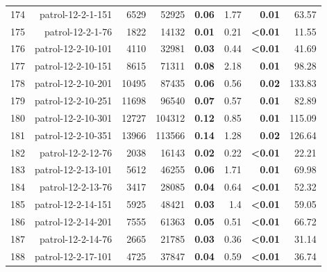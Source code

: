 \begin{longtable}{lrr@{\hskip 12pt}r@{\hskip 12pt}r@{\hskip 12pt}r@{\hskip 12pt}r@{\hskip 12pt}r}
174 & \multirow{1}{*}{patrol-12-2-1-151} & \multirow{1}{*}{6529} & \multirow{1}{*}{52925} & \textbf{0.06} & 1.77 & \textbf{0.01} & 63.57 \\
175 & \multirow{1}{*}{patrol-12-2-1-76} & \multirow{1}{*}{1822} & \multirow{1}{*}{14132} & \textbf{0.01} & 0.21 & \textbf{<0.01} & 11.55 \\
176 & \multirow{1}{*}{patrol-12-2-10-101} & \multirow{1}{*}{4110} & \multirow{1}{*}{32981} & \textbf{0.03} & 0.44 & \textbf{<0.01} & 41.69 \\
177 & \multirow{1}{*}{patrol-12-2-10-151} & \multirow{1}{*}{8615} & \multirow{1}{*}{71311} & \textbf{0.08} & 2.18 & \textbf{0.01} & 98.28 \\
178 & \multirow{1}{*}{patrol-12-2-10-201} & \multirow{1}{*}{10495} & \multirow{1}{*}{87435} & \textbf{0.06} & 0.56 & \textbf{0.02} & 133.83 \\
179 & \multirow{1}{*}{patrol-12-2-10-251} & \multirow{1}{*}{11698} & \multirow{1}{*}{96540} & \textbf{0.07} & 0.57 & \textbf{0.01} & 82.89 \\
180 & \multirow{1}{*}{patrol-12-2-10-301} & \multirow{1}{*}{12727} & \multirow{1}{*}{104312} & \textbf{0.12} & 0.85 & \textbf{0.01} & 115.09 \\
181 & \multirow{1}{*}{patrol-12-2-10-351} & \multirow{1}{*}{13966} & \multirow{1}{*}{113566} & \textbf{0.14} & 1.28 & \textbf{0.02} & 126.64 \\
182 & \multirow{1}{*}{patrol-12-2-12-76} & \multirow{1}{*}{2038} & \multirow{1}{*}{16143} & \textbf{0.02} & 0.22 & \textbf{<0.01} & 22.21 \\
183 & \multirow{1}{*}{patrol-12-2-13-101} & \multirow{1}{*}{5612} & \multirow{1}{*}{46255} & \textbf{0.06} & 1.71 & \textbf{0.01} & 69.98 \\
184 & \multirow{1}{*}{patrol-12-2-13-76} & \multirow{1}{*}{3417} & \multirow{1}{*}{28085} & \textbf{0.04} & 0.64 & \textbf{<0.01} & 52.32 \\
185 & \multirow{1}{*}{patrol-12-2-14-151} & \multirow{1}{*}{5925} & \multirow{1}{*}{48421} & \textbf{0.03} & 1.4 & \textbf{<0.01} & 59.05 \\
186 & \multirow{1}{*}{patrol-12-2-14-201} & \multirow{1}{*}{7555} & \multirow{1}{*}{61363} & \textbf{0.05} & 0.51 & \textbf{<0.01} & 66.72 \\
187 & \multirow{1}{*}{patrol-12-2-14-76} & \multirow{1}{*}{2665} & \multirow{1}{*}{21785} & \textbf{0.03} & 0.36 & \textbf{<0.01} & 31.14 \\
188 & \multirow{1}{*}{patrol-12-2-17-101} & \multirow{1}{*}{4725} & \multirow{1}{*}{37847} & \textbf{0.04} & 0.59 & \textbf{<0.01} & 36.74 \\

\end{longtable}
